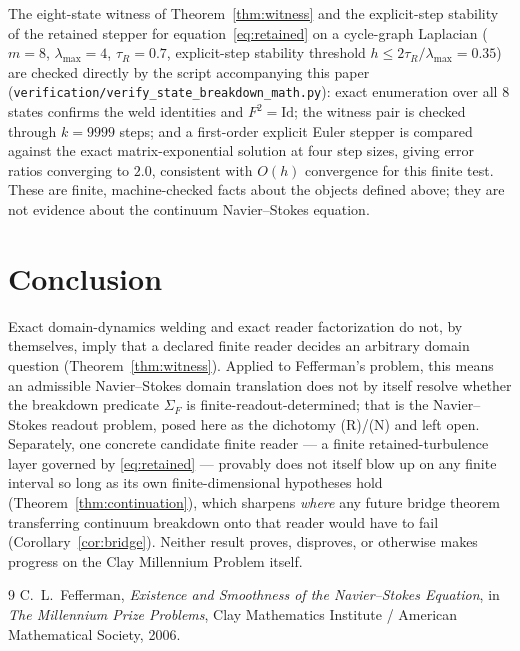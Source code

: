 \documentclass[11pt]{article}
\theoremstyle{plain}
\theoremstyle{definition}
\begin{document}
The eight-state witness of Theorem~\ref{thm:witness} and the explicit-step stability of the
retained stepper for equation~\eqref{eq:retained} on a cycle-graph Laplacian ($m=8$,
$\lambda_{\max}=4$, $\tau_R=0.7$, explicit-step stability threshold $h\le 2\tau_R/\lambda_{\max}=
0.35$) are checked directly by the script accompanying this paper
(\texttt{verification/verify\_state\_breakdown\_math.py}): exact enumeration over all $8$ states
confirms the weld identities and $F^2=\mathrm{Id}$; the witness pair is checked through $k=9999$
steps; and a first-order explicit Euler stepper is compared against the exact matrix-exponential
solution at four step sizes, giving error ratios converging to $2.0$, consistent with
$O(h)$ convergence for this finite test. These are finite, machine-checked facts about the objects
defined above; they are not evidence about the continuum Navier--Stokes equation.

\section{Conclusion}

Exact domain-dynamics welding and exact reader factorization do not, by themselves, imply that a
declared finite reader decides an arbitrary domain question (Theorem~\ref{thm:witness}). Applied to
Fefferman's problem, this means an admissible Navier--Stokes domain translation does not by itself
resolve whether the breakdown predicate $\Sigma_F$ is finite-readout-determined; that is the
Navier--Stokes readout problem, posed here as the dichotomy (R)/(N) and left open. Separately, one
concrete candidate finite reader --- a finite retained-turbulence layer governed by
\eqref{eq:retained} --- provably does not itself blow up on any finite interval so long as its own
finite-dimensional hypotheses hold (Theorem~\ref{thm:continuation}), which sharpens \emph{where}
any future bridge theorem transferring continuum breakdown onto that reader would have to fail
(Corollary~\ref{cor:bridge}). Neither result proves, disproves, or otherwise makes progress on the
Clay Millennium Problem itself.

\begin{thebibliography}{9}
C.~L.~Fefferman, \emph{Existence and Smoothness of the Navier--Stokes Equation}, in
\emph{The Millennium Prize Problems}, Clay Mathematics Institute / American Mathematical Society,
2006.
\end{thebibliography}
\end{document}
